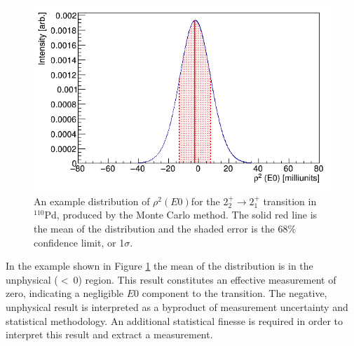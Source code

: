 \begin{figure}[!ht]
  \centering
  \includegraphics[width=\textwidth]{techniques_monte_carlo.png}
  \caption[An example distribution of $\rho^2(E0)$for the $2_2^+ \rightarrow 2_1^+$ transition in $^{110}\mathrm{Pd}$, produced by the Monte Carlo method.]{An example distribution of $\rho^2(E0)$for the $2_2^+ \rightarrow 2_1^+$ transition in $^{110}\mathrm{Pd}$, produced by the Monte Carlo method. The solid red line is the mean of the distribution and the shaded error is the $68\%$ confidence limit, or 1$\sigma$.}
  \label{figure: Monte Carlo distribution}
\end{figure}

In the example shown in Figure \ref{figure: Monte Carlo distribution} the mean of the distribution is in the unphysical ($< \ 0$) region. This result constitutes an effective measurement of zero, indicating a negligible $E0$ component to the transition. The negative, unphysical result is interpreted as a byproduct of measurement uncertainty and statistical methodology. An additional statistical finesse is required in order to interpret this result and extract a measurement. 

